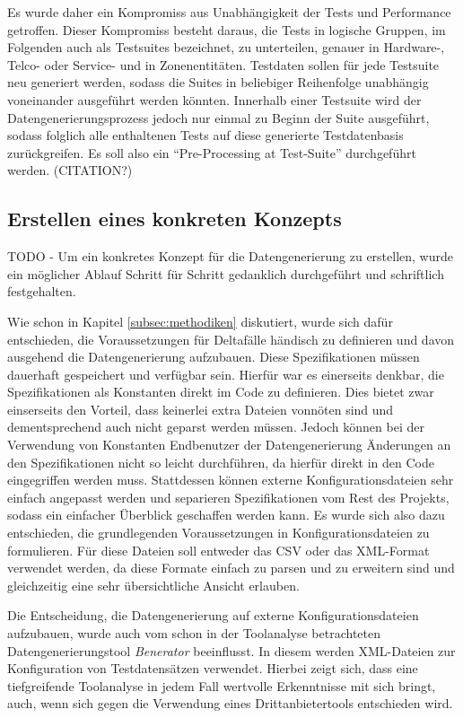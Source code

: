 Es wurde daher ein Kompromiss aus Unabhängigkeit der Tests und Performance getroffen. Dieser Kompromiss besteht daraus, die Tests in logische Gruppen, im Folgenden auch als Testsuites bezeichnet, zu unterteilen, genauer in Hardware-, Telco- oder Service- und in Zonenentitäten. Testdaten sollen für jede Testsuite neu generiert werden, sodass die Suites in beliebiger Reihenfolge unabhängig voneinander ausgeführt werden könnten. Innerhalb einer Testsuite wird der Datengenerierungsprozess jedoch nur einmal zu Beginn der Suite ausgeführt, sodass folglich alle enthaltenen Tests auf diese generierte Testdatenbasis zurückgreifen. Es soll also ein \enquote{Pre-Processing at Test-Suite} durchgeführt werden. (CITATION?)

\subsection{Erstellen eines konkreten Konzepts}\label{subsec:konzept}
TODO - Um ein konkretes Konzept für die Datengenerierung zu erstellen, wurde ein möglicher Ablauf Schritt für Schritt gedanklich durchgeführt und schriftlich festgehalten.

Wie schon in Kapitel \ref{subsec:methodiken} diskutiert, wurde sich dafür entschieden, die Voraussetzungen für Deltafälle händisch zu definieren und davon ausgehend die Datengenerierung aufzubauen. Diese Spezifikationen müssen dauerhaft gespeichert und verfügbar sein. Hierfür war es einerseits denkbar, die Spezifikationen als Konstanten direkt im Code zu definieren. Dies bietet zwar einserseits den Vorteil, dass keinerlei extra Dateien vonnöten sind und dementsprechend auch nicht geparst werden müssen. Jedoch können bei der Verwendung von Konstanten Endbenutzer der Datengenerierung Änderungen an den Spezifikationen nicht so leicht durchführen, da hierfür direkt in den Code eingegriffen werden muss. Stattdessen können externe Konfigurationsdateien sehr einfach angepasst werden und separieren Spezifikationen vom Rest des Projekts, sodass ein einfacher Überblick geschaffen werden kann. Es wurde sich also dazu entschieden, die grundlegenden Voraussetzungen in Konfigurationsdateien zu formulieren. Für diese Dateien soll entweder das \ac{CSV} oder das \ac{XML}-Format verwendet werden, da diese Formate einfach zu parsen und zu erweitern sind und gleichzeitig eine sehr übersichtliche Ansicht erlauben.

Die Entscheidung, die Datengenerierung auf externe Konfigurationsdateien aufzubauen, wurde auch vom schon in der Toolanalyse betrachteten Datengenerierungstool \textit{Benerator} beeinflusst. In diesem werden \ac{XML}-Dateien zur Konfiguration von Testdatensätzen verwendet. \cite{benerator:2022} Hierbei zeigt sich, dass eine tiefgreifende Toolanalyse in jedem Fall wertvolle Erkenntnisse mit sich bringt, auch, wenn sich gegen die Verwendung eines Drittanbietertools entschieden wird.

